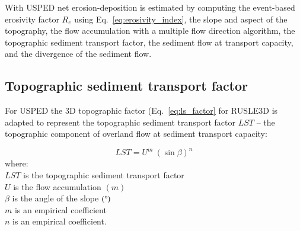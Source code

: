 \documentclass[final,3p,times,twocolumn]{elsarticle}
\begin{document}
With USPED net erosion-deposition is estimated by computing
the event-based erosivity factor $R_e$ using Eq.~\ref{eq:erosivity_index},
the slope and aspect of the topography,
the flow accumulation with a multiple flow direction algorithm,
the topographic sediment transport factor,
the sediment flow at transport capacity,
and the divergence of the sediment flow. 

\subsection{Topographic sediment transport factor}
For USPED
the 3D topographic factor (Eq.~\ref{eq:ls_factor} for RUSLE3D 
is adapted to represent the topographic sediment transport factor $LST$ --
the topographic component 
of overland flow at sediment transport capacity:

\begin{equation}
\label{eq:lst_factor}
{LST = U^{m} ~ (\sin \beta)^{n}}
\end{equation}
%
{\small
\noindent
where: \\
\noindent
\hspace*{0.5em} $LST$ is the topographic sediment transport factor\\
\hspace*{0.5em} $U$ is the flow accumulation $(m)$\\
\hspace*{0.5em} $\beta$ is the angle of the slope $(\degree)$\\
\hspace*{0.5em} $m$ is an empirical coefficient\\
\hspace*{0.5em} $n$ is an empirical coefficient.\\
}
\end{document}
